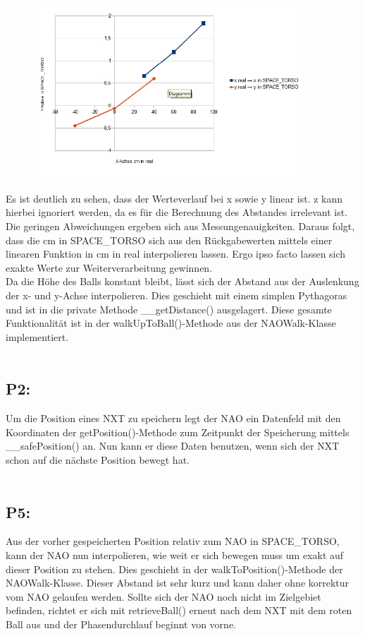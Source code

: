 \begin{figure}[ht]
    \centering
  \includegraphics[width=0.9\textwidth, angle=0]{img/nao_10.png}
\end{figure}

Es ist deutlich zu sehen, dass der Werteverlauf bei x sowie y linear ist. z kann hierbei ignoriert werden, da es für die Berechnung des Abstandes irrelevant ist. Die geringen Abweichungen  ergeben sich aus Messungenauigkeiten. 
Daraus folgt, dass die cm in SPACE\_TORSO sich aus den Rückgabewerten mittels einer linearen Funktion in cm in real interpolieren lassen. 
Ergo ipso facto lassen sich exakte Werte zur Weiterverarbeitung gewinnen.
\\
Da die Höhe des Balls konstant bleibt, lässt sich der Abstand aus der Auslenkung der x- und y-Achse interpolieren. Dies geschieht mit einem simplen Pythagoras und ist in die private Methode \_\_getDistance() ausgelagert.
Diese gesamte Funktionalität ist in der walkUpToBall()-Methode aus der NAOWalk-Klasse implementiert.
\\
\\
\subsection*{P2:}
Um die Position eines NXT zu speichern legt der NAO ein Datenfeld mit den Koordinaten der getPosition()-Methode zum Zeitpunkt der Speicherung mittels \_\_safePosition() an. Nun kann er diese Daten benutzen, wenn sich der NXT schon auf die nächste Position bewegt hat.
\\
\\
\subsection*{P5:}
Aus der vorher gespeicherten Position relativ zum NAO in SPACE\_TORSO, kann der NAO nun interpolieren, wie weit er sich bewegen muss um exakt auf dieser Position zu stehen. Dies geschieht in der walkToPosition()-Methode der NAOWalk-Klasse. Dieser Abstand ist sehr kurz und kann daher ohne korrektur vom NAO gelaufen werden.
Sollte sich der NAO noch nicht im Zielgebiet befinden, richtet er sich mit retrieveBall() erneut nach dem NXT mit dem roten Ball aus und der Phasendurchlauf beginnt von vorne.


